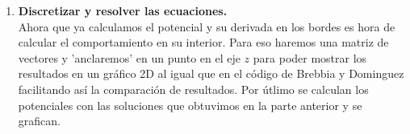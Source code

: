 \documentclass[11pt]{article}
\begin{document}
\begin{enumerate}
{Generación y resolución del sistema lineal: }Una vez que se tiene definido todo lo anterior se procede a definir el lado izquiero y derecho de la ecuación del problema, el cual posteriormente será resuelto usando $gmres$ al igual que el código anterior.
\item \textbf{Discretizar y resolver las ecuaciones.}\\
Ahora que ya calculamos el potencial y su derivada en los bordes es hora de calcular el comportamiento en su interior. Para eso haremos una matriz de vectores y 'anclaremos' en un punto en el eje $z$ para poder mostrar los resultados en un gráfico 2D al igual que en el código de Brebbia y Dominguez facilitando así la comparación de resultados.
Por útlimo se calculan los potenciales con las soluciones que obtuvimos en la parte anterior y se grafican.
\newpage
\end{enumerate}
\end{document}
